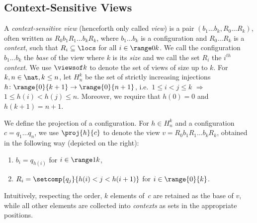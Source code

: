 \subsection{Context-Sensitive Views}
\label{section:view:contexts:abstract:domain}
%
A \emph{context-sensitive view} (henceforth only called \emph{view})
is a pair $(b_1\ldots b_k,R_0\ldots R_k)$, often written as
$R_0b_1R_1\ldots b_kR_k$, where $b_1\ldots b_k$ is a configuration and
$R_0\ldots R_k$ is a \emph{context}, such that $R_i\subseteq \locs$
for all $i\in\range 0 k$.
%
%
We call the configuration $b_1\ldots b_k$ the \emph{base} of the view
where $k$ is its \emph{size} and we call the set $R_i$ the $i^{th}$
\emph{context}. %
We use $\viewsof k$ to denote the set of views of size up to $k$.
%
For $k,n\in\nat, k\leq n$, let $H_n^k$ be the set of strictly
increasing injections $h \colon \range{0}{k+1} \rightarrow
\range{0}{n+1}$, i.e.\ \mbox{$1\leq i<j\leq
  k$} $\Rightarrow$ \mbox{$1\leq h(i)<h(j)\leq n$}.
%
Moreover, we require that $h(0) = 0$ and $h(k+1) = n+1$.

%
%
\begin{wrapfigure}{r}{0.48\linewidth}
  \hfill%
\end{wrapfigure}
%
We define the projection of a configuration.
%
For $h\in H_n^k$ and a configuration \mbox{$c=q_1\ldots q_n$}, we use
$\proj{h}{c}$ to denote the view %
\mbox{$v=R_0b_1R_1\ldots b_kR_k$}, obtained in the following way %
(depicted on the right): %
\begin{enumerate}[label={(\roman{*})}]
\item $b_i=q_{h(i)}$ for $i\in\range 1 k$, %
\item $R_i=\setcomp{q_j}{h(i)<j<h(i+1)}$ for $i\in\range{0}{k}$. %
\end{enumerate}
%
\smallskip%
Intuitively, respecting the order, $k$ elements of~$c$ are retained as
the base of $v$, while all other elements are collected
into %
\emph{contexts} as sets in the appropriate positions.

